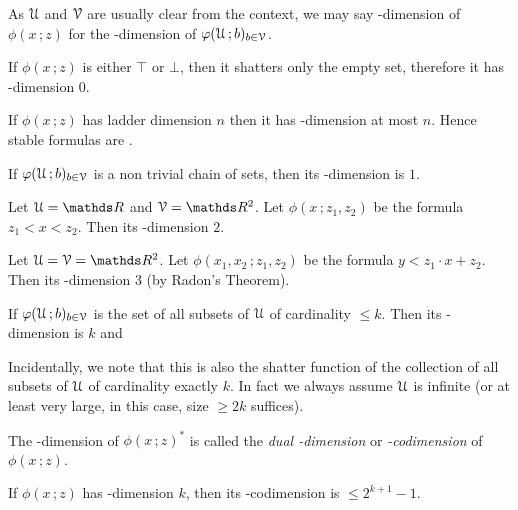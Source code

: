 \documentclass[scombinatorics.tex]{subfiles}
\begin{document}
As $\EuScript U$ and $\EuScript V$ are usually clear from the context, we may say \vc-dimension of $\phi(x\,;z)$ for the \vc-dimension of $\varphi(\EuScript U\,;b)_{b\in\EuScript V}$.

\begin{example}
  If $\phi(x\,;z)$ is either $\top$ or $\bot$, then it shatters only the empty set, therefore it has \vc-dimension $0$.\QED
\end{example}

\begin{example}
  If $\phi(x\,;z)$ has ladder dimension $n$ then it has \vc-dimension at most $n$. Hence stable formulas are \nip.\QED
\end{example}
 
\begin{example}
  If $\varphi(\EuScript U\,;b)_{b\in\EuScript V}$ is a non trivial chain of sets, then its \vc-dimension is $1$.\QED
\end{example}
 
\begin{example} 
  Let $\U=\RR$ and $\V=\RR^2$.
  Let $\phi(x\,;z_1,z_2)$ be the formula $z_1<x<z_2$.
  Then its \vc-dimension $2$.\QED
\end{example}
 
\begin{example} 
  Let $\U=\V=\RR^2$.
  Let $\phi(x_1,x_2\,;z_1,z_2)$ be the formula $y<z_1\cdot x + z_2$.
  Then its  \vc-dimension $3$ (by Radon's Theorem).\QED
\end{example}
 
\begin{example}\label{ex_vcdim_opt}
  If $\varphi(\EuScript U\,;b)_{b\in\EuScript V}$ is the set of all subsets of $\EuScript U$ of cardinality $\le k$.
  Then its \vc-dimension is $k$ and
  
  
  Incidentally, we note that this is also the shatter function of the collection of all subsets of $\EuScript U$ of cardinality exactly $k$.
  In fact we always assume $\EuScript U$ is infinite (or at least very large, in this case, size $\ge2k$ suffices).\QED
\end{example}

The \vc-dimension of $\phi(x\,;z)^*$ is called the \emph{dual \vc-dimension\/} or \emph{\vc-codimension\/} of $\phi(x\,;z)$.

\begin{proposition}\label{prop_bound_VCcodim}
  If $\phi(x\,;z)$ has \vc-dimension $k$, then its \vc-codimension is $\le2^{k+1}-1$.
\end{proposition}
  
\end{document}
